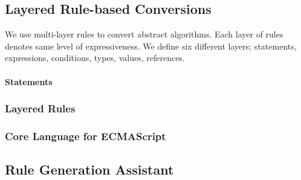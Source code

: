 \subsection{Layered Rule-based Conversions}

We use multi-layer rules to convert abstract algorithms.
Each layer of rules denotes same level of expressiveness.
We define six different layers; statements, expressions,
conditions, types, values, references.

\paragraph{Statements} 

\subsubsection{Layered Rules}


\subsubsection{Core Language for ECMAScript}


\subsection{Rule Generation Assistant}















